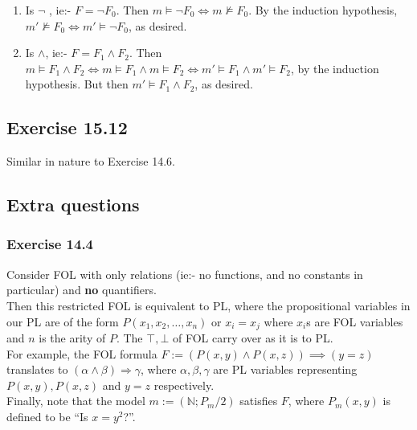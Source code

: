 \documentclass{article}
\begin{document}
\begin{enumerate}[label=(\alph*)]
\begin{enumerate}
        \item Is $\lnot$ , ie:- $F = \lnot F_0$. Then $m\models \lnot F_0\Longleftrightarrow m\not\models F_0$. By the induction hypothesis, $m'\not\models F_0\Longleftrightarrow m'\models\lnot F_0$, as desired.
        \item Is $\wedge$, ie:- $F = F_1\wedge F_2$. Then $m\models F_1\wedge F_2\Longleftrightarrow m\models F_1\wedge m\models F_2\Longleftrightarrow m'\models F_1\wedge m'\models F_2$, by the induction hypothesis. But then $m'\models F_1\wedge F_2$, as desired.
    \end{enumerate}
\end{enumerate}
\subsection*{Exercise 15.12}
Similar in nature to Exercise 14.6.
\subsection{Extra questions}
\subsubsection*{Exercise 14.4}
Consider FOL with only relations (ie:- no functions, and no constants in particular) and \textbf{no} quantifiers.\\
Then this restricted FOL is equivalent to PL, where the propositional variables in our PL are of the form $P(x_1, x_2, \ldots, x_n)$ or $x_i = x_j$ where $x_i$s are FOL variables and $n$ is the arity of $P$. The $\top, \bot$ of FOL carry over as it is to PL.\\
For example, the FOL formula $F:= (P(x, y)\wedge P(x, z))\implies (y = z)$ translates to $(\alpha\wedge\beta)\Rightarrow\gamma$, where $\alpha, \beta, \gamma$ are PL variables representing $P(x, y), P(x, z)$ and $y = z$ respectively. \\
Finally, note that the model $m := (\mathbb{N}; P_m/2)$ satisfies $F$, where $P_m(x, y)$ is defined to be ``Is $x = y^2$?''.
\end{document}
